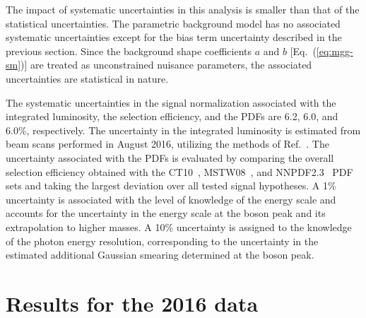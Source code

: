 The impact of systematic uncertainties in this analysis
is smaller than that of the statistical uncertainties.
The parametric background model has no associated systematic uncertainties
except for the bias term uncertainty described in the previous section.
Since the background shape coefficients $a$ and $b$
[Eq.~(\ref{eq:mgg-sm})]
are treated as unconstrained nuisance parameters,
the associated uncertainties are statistical in nature.

The systematic uncertainties in the signal normalization
associated with the integrated luminosity,
the selection efficiency,
and the PDFs
are 6.2, 6.0, and 6.0\%, respectively.
The uncertainty in the integrated luminosity is estimated from
beam scans performed in August 2016,
utilizing the methods of Ref.~\cite{CMS-PAS-LUM-15-001}.
The uncertainty associated with the PDFs is evaluated
by comparing the overall selection efficiency obtained with
the CT10~\cite{Lai:2010vv}, MSTW08~\cite{Martin2009}, and NNPDF2.3~\cite{Ball:2012cx} PDF
sets and taking the largest deviation over all tested signal hypotheses.
A 1\% uncertainty is associated with the level of knowledge of the energy scale
and accounts for the uncertainty in the energy scale at the {\PZ} boson
peak and its extrapolation to higher masses.
A 10\% uncertainty is assigned to the knowledge of the photon energy resolution,
corresponding to the uncertainty in the estimated additional Gaussian smearing determined
at the {\PZ} boson peak.

\section{Results for the 2016 data}
\label{sec:results:13fb}


